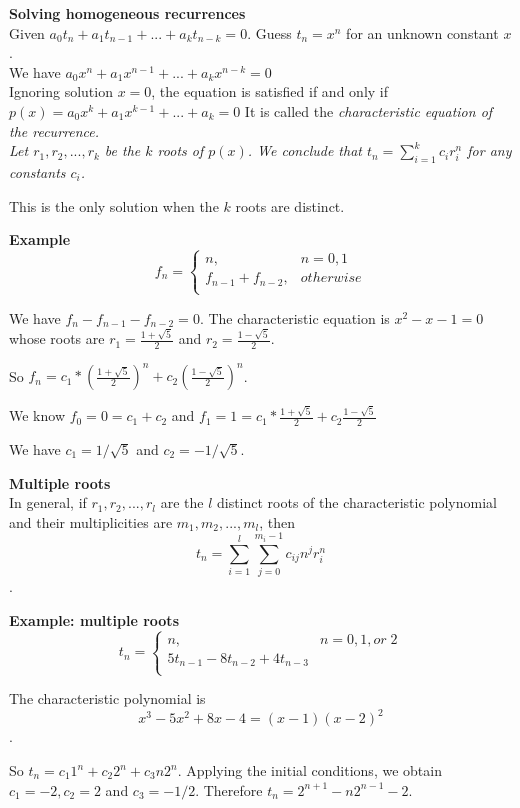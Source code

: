 \documentclass{seminar}
\begin{document}
\begin{slide}
{\bf Solving  homogeneous recurrences} \\
Given $a_0t_n+a_1t_{n-1}+...+a_kt_{n-k}=0$. Guess $t_n=x^n$ for an unknown
constant $x$.\\
We have  $a_0x^n+a_1x^{n-1}+...+a_kx^{n-k}=0$ \\
Ignoring solution $x=0$, the equation is satisfied if and only if \\
$p(x)=a_0x^k+a_1x^{k-1}+...+a_k=0$
It is called the \em{characteristic equation} of the recurrence. \\

Let $r_1, r_2,..., r_k$ be the $k$ roots of $p(x)$. We conclude that
$t_n=\sum_{i=1}^{k}{c_ir_i^n}$ for any constants $c_i$.

This is the only solution when the $k$ roots are distinct.
\end{slide}

\begin{slide}
{\bf Example} \\
\[f_n = \left \{
         \begin{array}{ll}
         n, & n=0,1\\
         f_{n-1} + f_{n-2}, & otherwise\\
	 \end{array}
        \right.
\]

We have $f_n - f_{n-1} - f_{n-2} =0$.
The characteristic equation is $x^2 -  x -1 =0$ \\

whose roots are
$r_1=\frac{1+\sqrt{5}}{2}$ and $r_2=\frac{1-\sqrt{5}}{2}$.

So $f_n = c_1*(\frac{1+\sqrt{5}}{2})^n + c_2(\frac{1-\sqrt{5}}{2})^n$.

We know $f_0=0=c_1+c_2$ and
$f_1=1=c_1*\frac{1+\sqrt{5}}{2}+c_2\frac{1-\sqrt{5}}{2}$

We have $c_1=1/\sqrt{5}$ and $c_2=-1/\sqrt{5}$.
\end{slide}

\begin{slide}
{\bf Multiple roots} \\
In general, if $r_1, r_2, ...,r_l$ are the $l$ distinct roots of the
characteristic polynomial and their multiplicities are $m_1,m_2,...,m_l$, 
then $$t_n = \sum_{i=1}^{l}\sum_{j=0}^{m_i-1}c_{ij} n^j r_i^n$$.
\end{slide}

\begin{slide}
{\bf Example: multiple roots}
\[ 
t_n = \left\{ 
  \begin{array}{ll}
     n, & n=0,1,or \; 2 \\
     5t_{n-1}-8t_{n-2}+4t_{n-3} & \\
   \end{array}
\right.
\]

The characteristic polynomial is $$x^3-5x^2+8x-4=(x-1)(x-2)^2$$.

So $t_n=c_1 1^n + c_2 2^n + c_3 n 2^n$.
Applying the initial conditions, we obtain $c_1=-2, c_2=2$ and $c_3=-1/2$. 
Therefore $t_n=2^{n+1}-n 2^{n-1}-2$.
\end{slide}
\end{document}
